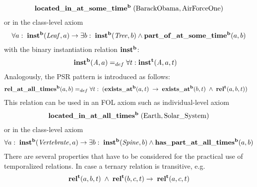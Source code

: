 \begin{equation}
\begin{split}
\mathrm{\mathbf{located\_in\_at\_some\_time^b}} \;(\mathrm{BarackObama}, \mathrm{AirForceOne})  
\end{split}
\label{eq:personlocated}
\end{equation}
%
or in the class-level axiom
%
\begin{equation}
\begin{split}
\forall a:\; \mathrm{\mathbf{inst^b}}(\mathit{Leaf}, a) 
\rightarrow
\exists b:\;\mathrm{\mathbf{inst^b}}(\mathit{Tree}, b)
\wedge
\mathrm{\mathbf{part\_of\_at\_some\_time^b}}(a,b)  \end{split}
\label{eq:leaf2}
\end{equation}
%
with the binary instantiation relation $\mathrm{\mathbf{inst^b}}$:
%  
\begin{equation}
\begin{split}
\mathrm{\mathbf{inst^b}} (\mathit{A},a) =_{def}&\; \forall t: \mathrm{\mathbf{inst^t}}(\mathit{A},a,t)  
\end{split}
\label{eq:temporarily:inst}
\end{equation}
%
Analogously, the PSR pattern is introduced as follows:  
%
\begin{equation}
\begin{split}
\mathrm{\mathbf{rel\_at\_all\_times^b}} (a,b) =_{def}&\;
\forall t: \; (\mathrm{\mathbf{exists\_at^b}} (a, t) \; \rightarrow \; \mathrm{\mathbf{exists\_at^b}} (b, t) \; \wedge \; \mathrm{\mathbf{rel^t}}(a,b,t))  
\end{split}
\label{eq:permanently:ind}
\end{equation}
%
This relation can be used in an FOL axiom such as individual-level axiom
%
\begin{equation}
\begin{split}
\mathrm{\mathbf{located\_in\_at\_all\_times^b}} \;(\mathrm{Earth}, \mathrm{Solar\_System})  
\end{split}
\label{eq:earth}
\end{equation}
%
or in the class-level axiom
%
\begin{equation}
\begin{split}
\forall a:\; \mathrm{\mathbf{inst^b}}(\mathit{Vertebrate}, a) 
\rightarrow
\exists b:\;\mathrm{\mathbf{inst^b}}(\mathit{Spine}, b)
\wedge
\mathrm{\mathbf{has\_part\_at\_all\_times^b}}(a,b)  \end{split}
\label{eq:spine}
\end{equation}
%  
There are several properties that have to be considered for the practical use of temporalized relations. In case a ternary relation is transitive, e.g.  
%
\begin{equation}
\begin{split}
\mathrm{\mathbf{rel^t}}(a,b,t) \; \wedge \; \mathrm{\mathbf{rel^t}}(b,c,t) \rightarrow \; \mathrm{\mathbf{rel^t}}(a,c,t)   
\end{split}
\label{eq:trtrans}
\end{equation}    
